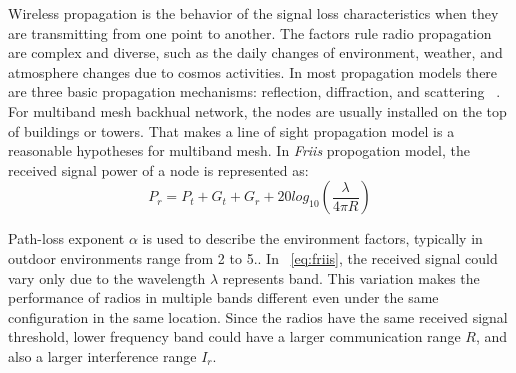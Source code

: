 Wireless propagation is the behavior of the signal loss characteristics when they are transmitting from one point to another.
The factors rule radio propagation are complex and diverse, 
such as the daily changes of environment, weather, and atmosphere changes due to cosmos activities. 
In most propagation models there are three basic propagation mechanisms: reflection, diffraction, and scattering ~\cite{andersen1995propagation}.
For multiband mesh backhual network, the nodes are usually installed on the top of buildings or towers. That makes a line of sight propagation model is a reasonable hypotheses for multiband mesh.
In \emph{Friis} propogation model, the received signal power of a node is represented as: 
\begin{equation}
\label{eq:friis}
P_r=P_t+G_t+G_r+20log_{10}(\frac{\lambda}{4\pi R})
\end{equation}

Path-loss exponent \emph{$\alpha$} is used to describe the environment factors, typically in outdoor environments range from 2 to 5.\cite{camp2006measurement}. 
In ~\ref{eq:friis}, the received signal could vary only due to the wavelength $\lambda$ represents band. 
This variation makes the performance of radios in multiple bands different even under the same configuration in the same location. Since the radios have the same received signal threshold, lower frequency band could have a larger communication range $R$, and also a larger interference range $I_r$.


